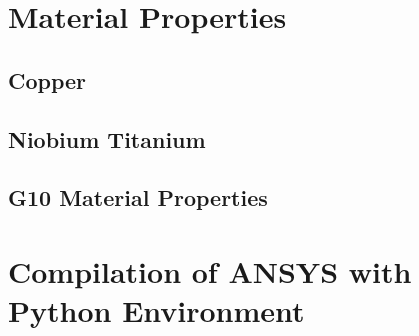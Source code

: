 \documentclass{article}
\begin{document}
% 

\clearpage
\begin{appendices}

\section{Material Properties}
\label{appendix_material_properties_description}


\subsection{Copper}
\label{appendix:cu_material_properties}


\subsection{Niobium Titanium}
\label{appendix:nbti_material_properties}


\subsection{G10 Material Properties}
\label{appendix:g10_material_properties}


\clearpage
\section{Compilation of ANSYS with Python Environment}
\label{appendix:python_ansys_compilation}



\end{appendices}

\clearpage


\end{document}
